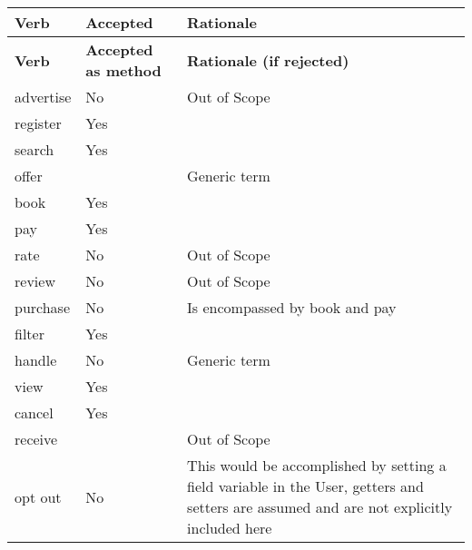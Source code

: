 \renewcommand*{\arraystretch}{1.3}
\begin{longtable}{m{2.5cm} >{\centering\arraybackslash}m{2cm} m{6cm}}
	\toprule
	\textbf{Verb} & \textbf{Accepted} & \textbf{Rationale} \\
	\midrule
	\endhead
	\toprule
	\textbf{Verb} & \textbf{Accepted as method} & \textbf{Rationale (if rejected)} \\
	\endfirsthead
	\midrule
	advertise & No & Out of Scope \\
	\midrule
	register & Yes &  \\
	\midrule
	search & Yes &  \\
	\midrule
	offer &  & Generic term \\
	\midrule
	book & Yes &  \\
	\midrule
	pay & Yes &  \\
	\midrule
	rate & No & Out of Scope \\
	\midrule
	review & No & Out of Scope \\
	\midrule
	purchase & No & Is encompassed by book and pay \\
	\midrule
	filter & Yes &  \\
	\midrule
	handle & No & Generic term \\
	\midrule
	view & Yes &  \\
	\midrule
	cancel & Yes &  \\
	\midrule
	receive &  & Out of Scope \\
	\midrule
	opt out & No & This would be accomplished by setting a field variable in
	the User, getters and setters are assumed and are not explicitly
	included here \\
	\bottomrule
\end{longtable}
